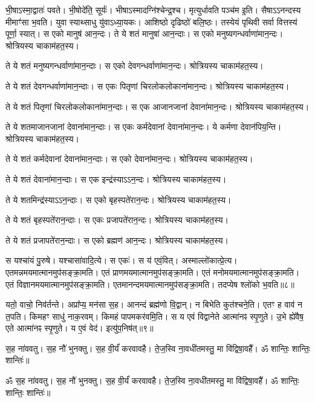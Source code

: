 भी॒षाऽस्मा॒द्वातः॑ पवते। 
भी॒षोदे॑ति॒ सूर्यः॑। 
भीषाऽस्मादग्नि॑\-श्चेन्द्र॒श्च। 
मृत्युर्धावति पञ्च॑म इ॒ति। 
सैषाऽऽनन्दस्य मीमाꣳ॑सा भ॒वति। 
युवा स्याथ्साधु यु॑वाऽध्या॒यकः। 
आशिष्ठो दृढिष्ठो॑ बलि॒ष्ठः। 
तस्येयं पृथिवी सर्वा वित्तस्य॑ पूर्णा॒ स्यात्। 
स एको मानुष॑ आन॒न्दः। 
ते ये शतं मानुषा॑ आन॒न्दाः। 
स एको मनुष्यगन्धर्वाणा॑मान॒न्दः। 
श्रोत्रियस्य चाकाम॑हत॒स्य। 

ते ये शतं मनुष्यगन्धर्वाणा॑मान॒न्दाः। 
स एको देवगन्धर्वाणा॑मान॒न्दः। 
श्रोत्रियस्य चाकाम॑हत॒स्य। 

ते ये शतं देवगन्धर्वाणा॑मान॒न्दाः। 
स एकः पितृणां चिरलोकलोकाना॑मान॒न्दः। 
श्रोत्रियस्य चाकाम॑हत॒स्य। 

ते ये शतं पितृणां चिरलोकलोकाना॑\-मान॒न्दाः। 
स एक आजानजानां देवाना॑मान॒न्दः। 
श्रोत्रियस्य चाकाम॑हत॒स्य। 

ते ये शतमाजानजानां देवाना॑मान॒न्दाः। 
स एकः कर्मदेवानां देवाना॑मान॒न्दः। 
ये कर्मणा देवान॑पिय॒न्ति। 
श्रोत्रियस्य चाकाम॑हत॒स्य। 

ते ये शतं कर्मदेवानां देवाना॑मान॒न्दाः। 
स एको देवाना॑मान॒न्दः। 
श्रोत्रियस्य चाकाम॑हत॒स्य। 

ते ये शतं देवाना॑मान॒न्दाः। 
स एक इन्द्र॑स्याऽऽन॒न्दः। 
श्रोत्रियस्य चाकाम॑हत॒स्य। 

ते ये शतमिन्द्र॑स्याऽऽन॒न्दाः। 
स एको बृहस्पते॑रान॒न्दः। 
श्रोत्रियस्य चाकाम॑हत॒स्य। 

ते ये शतं बृहस्पते॑रान॒न्दाः। 
स एकः प्रजापते॑रान॒न्दः। 
श्रोत्रियस्य चाकाम॑हत॒स्य। 

ते ये शतं प्रजापते॑रान॒न्दाः। 
स एको ब्रह्मण॑ आन॒न्दः। 
श्रोत्रियस्य चाकाम॑हत॒स्य। 

स यश्चा॑यं पु॒रुषे। 
यश्चासा॑वादि॒त्ये। 
स एकः॑। 
स य॑ एवं॒वित्। 
अस्माल्लो॑कात्प्रे॒त्य। 
एतमन्नमयमात्मानमुप॑सङ्क्रा॒मति। 
एतं प्राणमयमात्मानमुप॑सङ्क्रा॒मति। 
एतं मनोमयमात्मानमुप॑\-सङ्क्रा॒मति। 
एतं विज्ञानमयमात्मानमुप॑\-सङ्क्रा॒मति। 
एतमानन्द\-मयमात्मानमुप॑\-सङ्क्रा॒मति। 
तदप्येष श्लो॑को भ॒वति॥८॥

यतो॒ वाचो॒ निव॑र्तन्ते। 
अप्रा᳚प्य॒ मन॑सा स॒ह। 
आनन्दं ब्रह्म॑णो वि॒द्वान्। 
न बिभेति कुत॑श्चने॒ति। 
एतꣳ ह वाव॑ न त॒पति। 
किमहꣳ साधु॑ नाक॒रवम्। 
किमहं पापमकर॑वमि॒ति। 
स य एवं विद्वानेते आत्मा॑नꣴ स्पृ॒णुते। 
उ॒भे ह्ये॑वैष॒ एते आत्मा॑नꣴ स्पृ॒णुते। 
य ए॒वं वेद॑। 
इत्यु॑प॒निष॑त्॥९॥

स॒ह ना॑ववतु। 
स॒ह नौ॑ भुनक्तु। 
स॒ह वी॒र्यं॑ करवावहै। 
ते॒ज॒स्वि ना॒वधी॑तमस्तु॒ मा वि॑द्विषा॒वहै᳚। 
ॐ शान्तिः॒ शान्तिः॒ शान्तिः॑॥

\setcounter{anuvakam}{0}
ॐ स॒ह ना॑ववतु। 
स॒ह नौ॑ भुनक्तु। 
स॒ह वी॒र्यं॑ करवावहै। 
ते॒ज॒स्वि ना॒वधी॑तमस्तु॒ मा वि॑द्विषा॒वहै᳚। 
ॐ शान्तिः॒ शान्तिः॒ शान्तिः॑॥


